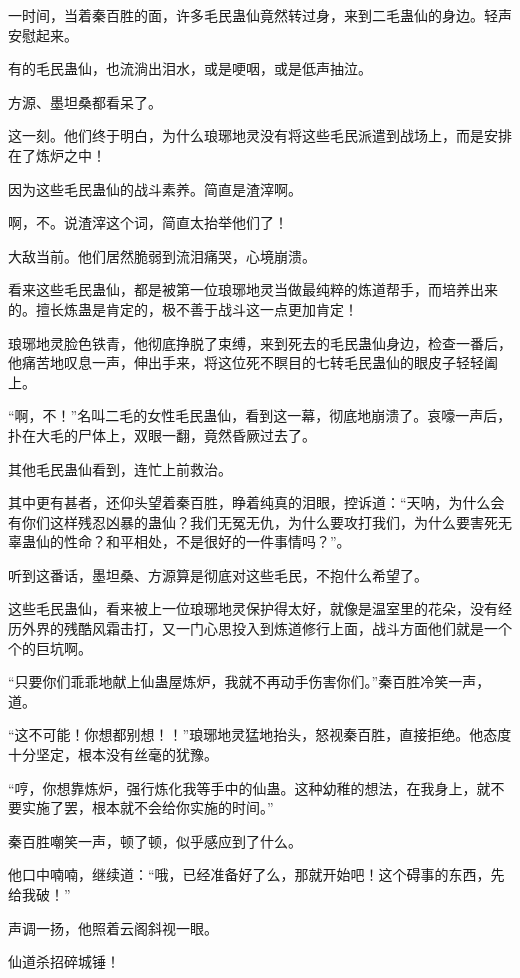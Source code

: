 \begin{this_body}
一时间，当着秦百胜的面，许多毛民蛊仙竟然转过身，来到二毛蛊仙的身边。轻声安慰起来。

有的毛民蛊仙，也流淌出泪水，或是哽咽，或是低声抽泣。

方源、墨坦桑都看呆了。

这一刻。他们终于明白，为什么琅琊地灵没有将这些毛民派遣到战场上，而是安排在了炼炉之中！

因为这些毛民蛊仙的战斗素养。简直是渣滓啊。

啊，不。说渣滓这个词，简直太抬举他们了！

大敌当前。他们居然脆弱到流泪痛哭，心境崩溃。

看来这些毛民蛊仙，都是被第一位琅琊地灵当做最纯粹的炼道帮手，而培养出来的。擅长炼蛊是肯定的，极不善于战斗这一点更加肯定！

琅琊地灵脸色铁青，他彻底挣脱了束缚，来到死去的毛民蛊仙身边，检查一番后，他痛苦地叹息一声，伸出手来，将这位死不瞑目的七转毛民蛊仙的眼皮子轻轻阖上。

“啊，不！”名叫二毛的女性毛民蛊仙，看到这一幕，彻底地崩溃了。哀嚎一声后，扑在大毛的尸体上，双眼一翻，竟然昏厥过去了。

其他毛民蛊仙看到，连忙上前救治。

其中更有甚者，还仰头望着秦百胜，睁着纯真的泪眼，控诉道：“天呐，为什么会有你们这样残忍凶暴的蛊仙？我们无冤无仇，为什么要攻打我们，为什么要害死无辜蛊仙的性命？和平相处，不是很好的一件事情吗？”。

听到这番话，墨坦桑、方源算是彻底对这些毛民，不抱什么希望了。

这些毛民蛊仙，看来被上一位琅琊地灵保护得太好，就像是温室里的花朵，没有经历外界的残酷风霜击打，又一门心思投入到炼道修行上面，战斗方面他们就是一个个的巨坑啊。

“只要你们乖乖地献上仙蛊屋炼炉，我就不再动手伤害你们。”秦百胜冷笑一声，道。

“这不可能！你想都别想！！”琅琊地灵猛地抬头，怒视秦百胜，直接拒绝。他态度十分坚定，根本没有丝毫的犹豫。

“哼，你想靠炼炉，强行炼化我等手中的仙蛊。这种幼稚的想法，在我身上，就不要实施了罢，根本就不会给你实施的时间。”

秦百胜嘲笑一声，顿了顿，似乎感应到了什么。

他口中喃喃，继续道：“哦，已经准备好了么，那就开始吧！这个碍事的东西，先给我破！”

声调一扬，他照着云阁斜视一眼。

仙道杀招碎城锤！


\end{this_body}
